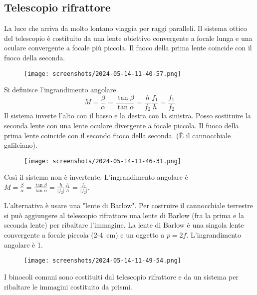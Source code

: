 \subsection{Telescopio rifrattore}
La luce che arriva da molto lontano viaggia per raggi paralleli. Il sistema ottico del telescopio è costituito da una lente obiettivo convergente a focale lunga e una oculare convergente a focale più piccola. Il fuoco della prima lente coincide con il fuoco della seconda.
\begin{figure}[H]
	\centering
	\texttt{[image: screenshots/2024-05-14-11-40-57.png]}
\end{figure}
Si definisce l'ingrandimento angolare
\begin{equation}
	M = \frac{\beta }{\alpha } = \frac{\tan \beta }{\tan \alpha } = \frac{h}{f_2} \frac{f_1}{h} = \frac{f_1}{f_2}
\end{equation}
Il sistema inverte l'alto con il basso e la destra con la sinistra. Posso sostituire la seconda lente con una lente oculare divergente a focale piccola. Il fuoco della prima lente coincide con il secondo fuoco della seconda. (È il cannocchiale galileiano).
\begin{figure}[H]
	\centering
	\texttt{[image: screenshots/2024-05-14-11-46-31.png]}
\end{figure}
Così il sistema non è invertente. L'ingrandimento angolare è \(M=\frac{\beta }{\alpha } = \frac{\tan \beta }{\tan \alpha } = \frac{h}{\vert f_2 \vert } \frac{f_1}{h} = \frac{f_1}{\vert f_2 \vert }\).

L'alternativa è usare una "lente di Barlow". Per costruire il cannocchiale terrestre si può aggiungere al telescopio rifrattore una lente di Barlow (fra la prima e la seconda lente) per ribaltare l'immagine. La lente di Barlow è una singola lente convergente a focale piccola (\num{2}-\SI{4}{cm}) e un oggetto a \(p=2f\). L'ingrandimento angolare è 1.
\begin{figure}[H]
	\centering
	\texttt{[image: screenshots/2024-05-14-11-49-54.png]}
\end{figure}

I binocoli comuni sono costituiti dal telescopio rifrattore e da un sistema per ribaltare le immagini costituito da prismi.

